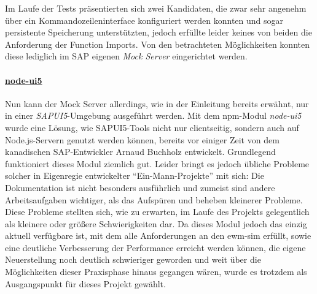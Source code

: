 Im Laufe der Tests präsentierten sich zwei Kandidaten, die zwar sehr angenehm über ein Kommandozeileninterface konfiguriert werden konnten und sogar persistente Speicherung unterstützten, jedoch erfüllte leider keines von beiden die Anforderung der Function Imports.
Von den betrachteten Möglichkeiten konnten diese lediglich im SAP eigenen \emph{Mock Server} eingerichtet werden.

\paragraph{\href{https://github.com/ArnaudBuchholz/node-ui5}{node-ui5}}
Nun kann der Mock Server allerdings, wie in der Einleitung bereits erwähnt, nur in einer \emph{SAPUI5}-Umgebung ausgeführt werden.
Mit dem \ac{npm}-Modul \emph{node-ui5} wurde eine Lösung, wie SAPUI5-Tools nicht nur clientseitig, sondern auch auf Node.js-Servern genutzt werden können, bereits vor einiger Zeit von dem kanadischen SAP-Entwickler Arnaud Buchholz entwickelt.
Grundlegend funktioniert dieses Modul ziemlich gut.
Leider bringt es jedoch übliche Probleme solcher in Eigenregie entwickelter \enquote{Ein-Mann-Projekte} mit sich: Die Dokumentation ist nicht besonders ausführlich und zumeist sind andere Arbeitsaufgaben wichtiger, als das Aufspüren und beheben kleinerer Probleme.
Diese Probleme stellten sich, wie zu erwarten, im Laufe des Projekts gelegentlich als kleinere oder größere Schwierigkeiten dar.
Da dieses Modul jedoch das einzig aktuell verfügbare ist, mit dem alle Anforderungen an den \ac{ewm-sim} erfüllt, sowie eine deutliche Verbesserung der Performance erreicht werden können, die eigene Neuerstellung noch deutlich schwieriger geworden und weit über die Möglichkeiten dieser Praxisphase hinaus gegangen wären, wurde es trotzdem als Ausgangspunkt für dieses Projekt gewählt.